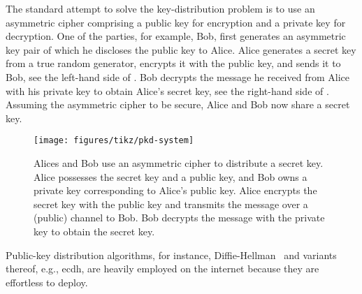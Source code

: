 The standard attempt to solve the key-distribution problem is to use an asymmetric cipher comprising a public key for encryption and a private key for decryption.
One of the parties, for example, Bob, first generates an asymmetric key pair of which he discloses the public key to Alice.
Alice generates a secret key from a true random generator, encrypts it with the public key, and sends it to Bob, see the left-hand side of .
Bob decrypts the message he received from Alice with his private key to obtain Alice's secret key, see the right-hand side of .
Assuming the asymmetric cipher to be secure, Alice and Bob now share a secret key.
\begin{figure}[htb]
	\centering
	\texttt{[image: figures/tikz/pkd-system]}
	\caption{Alices and Bob use an asymmetric cipher to distribute a secret key. Alice possesses the secret key and a public key, and Bob owns a private key corresponding to Alice's public key. Alice encrypts the secret key with the public key and transmits the message over a (public) channel to Bob. Bob decrypts the message with the private key to obtain the secret key.}\label{fig:pkd_system}
\end{figure}
Public-key distribution algorithms, for instance, Diffie-Hellman~\cite{Diffie1976} and variants thereof, e.g., \gls{ecdh}, are heavily employed on the internet because they are effortless to deploy.

